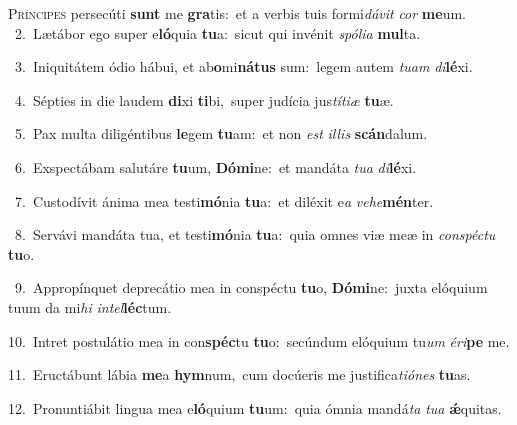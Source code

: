 \lettrine{\initial\textcolor{\initialcolor}{P}}{ríncipes} persecúti \textbf{sunt} me \textbf{gra}\-tis:~\star et a verbis tuis formi\-\textit{dá}\-\textit{vit} \textit{cor} \textbf{me}\-um.\\
{\numbfont\textcolor{\numbcolor}{~2.}}~Lætábor ego super e\-\textbf{ló}\-quia \textbf{tu}\-a:~\star sicut qui invénit \textit{spó}\-\textit{li}\textit{a} \textbf{mul}\-ta.\par
{\numbfont\textcolor{\numbcolor}{~3.}}~Iniquitátem ódio hábui, et ab\-\textbf{o}\-mi\-\textbf{ná}\-\textbf{tus} sum:~\star legem autem \textit{tu}\-\textit{am} \textit{di}\-\textbf{lé}xi.\par
{\numbfont\textcolor{\numbcolor}{~4.}}~Sépties in die laudem \textbf{di}\-xi \textbf{ti}\-bi,~\star super judícia jus\-\textit{tí}\-\textit{ti}\textit{æ} \textbf{tu}\-æ.\par
{\numbfont\textcolor{\numbcolor}{~5.}}~Pax multa diligéntibus \textbf{le}\-gem \textbf{tu}\-am:~\star et non \textit{est} \textit{il}\-\textit{lis} \textbf{scán}\-dalum.\par
{\numbfont\textcolor{\numbcolor}{~6.}}~Exspectábam salutáre \textbf{tu}\-um, \textbf{Dó}\-\textbf{mi}ne:~\star et mandáta \textit{tu}\-\textit{a} \textit{di}\-\textbf{lé}xi.\par
{\numbfont\textcolor{\numbcolor}{~7.}}~Custodívit ánima mea testi\-\textbf{mó}\-nia \textbf{tu}\-a:~\star et diléxit e\textit{a} \textit{ve}\-\textit{he}\textbf{mén}ter.\par
{\numbfont\textcolor{\numbcolor}{~8.}}~Servávi mandáta tua, et testi\-\textbf{mó}\-nia \textbf{tu}\-a:~\star quia omnes viæ meæ in \textit{con}\-\textit{spéc}\textit{tu} \textbf{tu}\-o.\par
{\numbfont\textcolor{\numbcolor}{~9.}}~Appropínquet deprecátio mea in conspéctu \textbf{tu}\-o, \textbf{Dó}\-\textbf{mi}ne:~\star juxta elóquium tuum da mi\textit{hi} \textit{in}\-\textit{tel}\textbf{léc}tum.\par
{\numbfont\textcolor{\numbcolor}{10.}}~Intret postulátio mea in con\-\textbf{spéc}\-tu \textbf{tu}\-o:~\star secúndum elóquium tu\textit{um} \textit{é}\-\textit{ri}\textbf{pe} me.\par
{\numbfont\textcolor{\numbcolor}{11.}}~Eructábunt lábia \textbf{me}\-a \textbf{hym}\-num,~\star cum docúeris me justifica\-\textit{ti}\-\textit{ó}\textit{nes} \textbf{tu}\-as.\par
{\numbfont\textcolor{\numbcolor}{12.}}~Pronuntiábit lingua mea e\-\textbf{ló}\-quium \textbf{tu}\-um:~\star quia ómnia mandá\textit{ta} \textit{tu}\-\textit{a} \textbf{ǽ}\-quitas.\par
